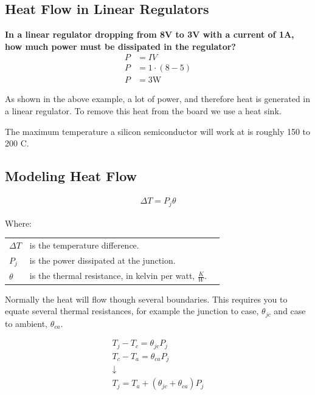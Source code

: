 \subsection{Heat Flow in Linear Regulators}

\begin{framed}
\textbf{In a linear regulator dropping from 8V to 3V with a current of 1A, how much power must be dissipated in the regulator?}
\begin{align*}
P &= IV \\
P &= 1\cdot(8-5) \\
P &= 3\textrm{W}
\end{align*}
\end{framed}

As shown in the above example, a lot of power, and therefore heat is generated in a linear regulator. To remove this heat from the board we use a heat sink.

The maximum temperature a silicon semiconductor will work at is roughly 150 to 200 \degree C.

\subsection{Modeling Heat Flow}

\begin{align*}
\Delta T = P_j \theta
\end{align*}

Where:

\begin{table}[H]
	\centering
    \begin{tabular}{lll}
    $\Delta T$ & is the temperature difference. \\
    $P_j$      & is the power dissipated at the junction. \\
    $\theta$   & is the thermal resistance, in kelvin per watt, $\frac{K}{W}$. \\
    \end{tabular}
\end{table}

Normally the heat will flow though several boundaries. This requires you to equate several thermal resistances, for example the junction to case, $\theta_{jc}$ and case to ambient, $\theta_{ca}$.

\begin{gather*}
T_j - T_c = \theta_{jc}P_j \\
T_c - T_a = \theta_{ca}P_j \\
\downarrow \\
T_j = T_a + (\theta_{jc} + \theta_{ca})P_j
\end{gather*}

